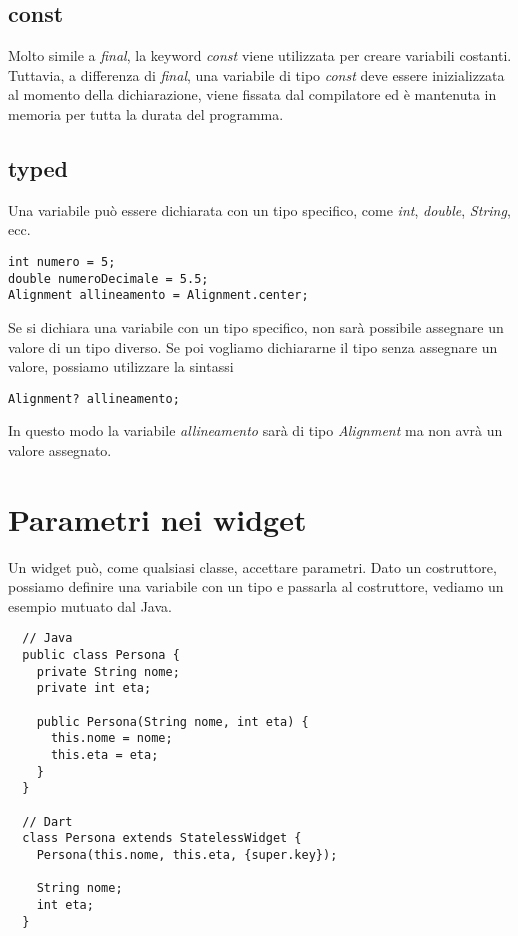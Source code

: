 \documentclass[12pt]{article}
\begin{document}
\subsection{const}
Molto simile a \textit{final}, la keyword \textit{const} viene utilizzata
per creare variabili costanti. Tuttavia, a differenza di \textit{final},
una variabile di tipo \textit{const} deve essere inizializzata al momento
della dichiarazione, viene fissata dal compilatore ed 
è mantenuta in memoria per tutta la durata del programma.


\subsection{typed}
Una variabile può essere dichiarata con un tipo specifico,
come \textit{int}, \textit{double}, \textit{String}, ecc.
\begin{highlight}
\begin{verbatim}
int numero = 5;
double numeroDecimale = 5.5;
Alignment allineamento = Alignment.center;
\end{verbatim}
\end{highlight}
Se si dichiara una variabile con un tipo specifico, non sarà possibile
assegnare un valore di un tipo diverso. Se poi vogliamo dichiararne
il tipo senza assegnare un valore, possiamo utilizzare la sintassi
\begin{highlight}
\begin{verbatim}
Alignment? allineamento;
\end{verbatim}
\end{highlight}
In questo modo la variabile \textit{allineamento} sarà di tipo \textit{Alignment}
ma non avrà un valore assegnato.


\section{Parametri nei widget}
Un widget può, come qualsiasi classe, accettare parametri.
Dato un costruttore, possiamo definire una variabile
con un tipo e passarla al costruttore, vediamo 
un esempio mutuato dal Java.

\begin{highlight}
\begin{verbatim}
  // Java
  public class Persona {
    private String nome;
    private int eta;

    public Persona(String nome, int eta) {
      this.nome = nome;
      this.eta = eta;
    }
  }

  // Dart
  class Persona extends StatelessWidget {
    Persona(this.nome, this.eta, {super.key});

    String nome;
    int eta;
  }
\end{verbatim}
\end{highlight}
\end{document}
